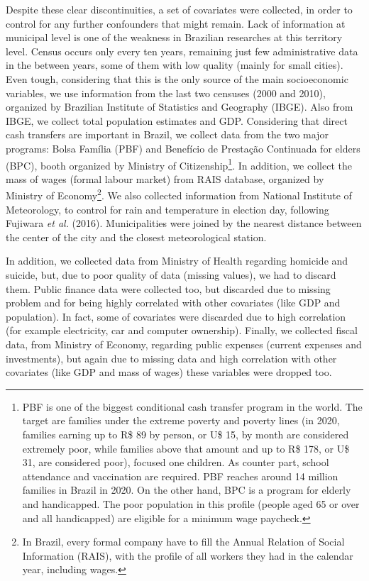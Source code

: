 \documentclass[
  12pt,
]{article}
\begin{document}
Despite these clear discontinuities, a set of covariates were collected,
in order to control for any further confounders that might remain. Lack
of information at municipal level is one of the weakness in Brazilian
researches at this territory level. Census occurs only every ten years,
remaining just few administrative data in the between years, some of
them with low quality (mainly for small cities). Even tough, considering
that this is the only source of the main socioeconomic variables, we use
information from the last two censuses (2000 and 2010), organized by
Brazilian Institute of Statistics and Geography (IBGE). Also from IBGE,
we collect total population estimates and GDP. Considering that direct
cash transfers are important in Brazil, we collect data from the two
major programs: Bolsa Família (PBF) and Benefício de Prestação
Continuada for elders (BPC), booth organized by Ministry of
Citizenship\footnote{PBF is one of the biggest conditional cash transfer
  program in the world. The target are families under the extreme
  poverty and poverty lines (in 2020, families earning up to R\$ 89 by
  person, or U\$ 15, by month are considered extremely poor, while
  families above that amount and up to R\$ 178, or U\$ 31, are
  considered poor), focused one children. As counter part, school
  attendance and vaccination are required. PBF reaches around 14 million
  families in Brazil in 2020. On the other hand, BPC is a program for
  elderly and handicapped. The poor population in this profile (people
  aged 65 or over and all handicapped) are eligible for a minimum wage
  paycheck.}. In addition, we collect the mass of wages (formal labour
market) from RAIS database, organized by Ministry of Economy\footnote{In
  Brazil, every formal company have to fill the Annual Relation of
  Social Information (RAIS), with the profile of all workers they had in
  the calendar year, including wages.}. We also collected information
from National Institute of Meteorology, to control for rain and
temperature in election day, following Fujiwara \emph{et al.} (2016).
Municipalities were joined by the nearest distance between the center of
the city and the closest meteorological station.

In addition, we collected data from Ministry of Health regarding
homicide and suicide, but, due to poor quality of data (missing values),
we had to discard them. Public finance data were collected too, but
discarded due to missing problem and for being highly correlated with
other covariates (like GDP and population). In fact, some of covariates
were discarded due to high correlation (for example electricity, car and
computer ownership). Finally, we collected fiscal data, from Ministry of
Economy, regarding public expenses (current expenses and investments),
but again due to missing data and high correlation with other covariates
(like GDP and mass of wages) these variables were dropped too.
\end{document}
